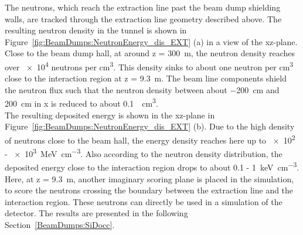 The neutrons, which reach the extraction line past the beam dump shielding walls, are tracked through the extraction line geometry described above.
The resulting neutron density in the tunnel is shown in Figure~\ref{fig:BeamDumps:NeutronEnergy_dis_EXT} (a) in a view of the xz-plane.
Close to the beam dump hall, at around z = \SI{300}{\meter}, the neutron density reaches over \num{e4} neutrons per \si{\centi\meter\cubed}.
This density sinks to about one neutron per \si{\centi\meter\cubed} close to the interaction region at z = \SI{9.3}{\meter}.
The beam line components shield the neutron flux such that the neutron density between about \SI{-200}{\centi\meter} and \SI{200}{\centi\meter} in x is reduced to about \SI{0.1}{\per\centi\meter\cubed}.
\\The resulting deposited energy is shown in the xz-plane in Figure~\ref{fig:BeamDumps:NeutronEnergy_dis_EXT} (b).
Due to the high density of neutrons close to the beam hall, the energy density reaches here up to 
\num{e2} - \SI{e3}{\MeV\per\centi\meter\cubed}.
Also according to the neutron density distribution, the deposited energy close to the interaction region drops to about \num{0.1} - \SI{1}{\keV\per\centi\meter\cubed}.
\\Here, at z = \SI{9.3}{\meter}, another imaginary scoring plane is placed in the \fluka simulation, to score the neutrons crossing the boundary between the extraction line and the interaction region.
These neutrons can directly be used in a \geant simulation of the \sid detector.
The results are presented in the following Section~\ref{BeamDumps:SiDocc}.
